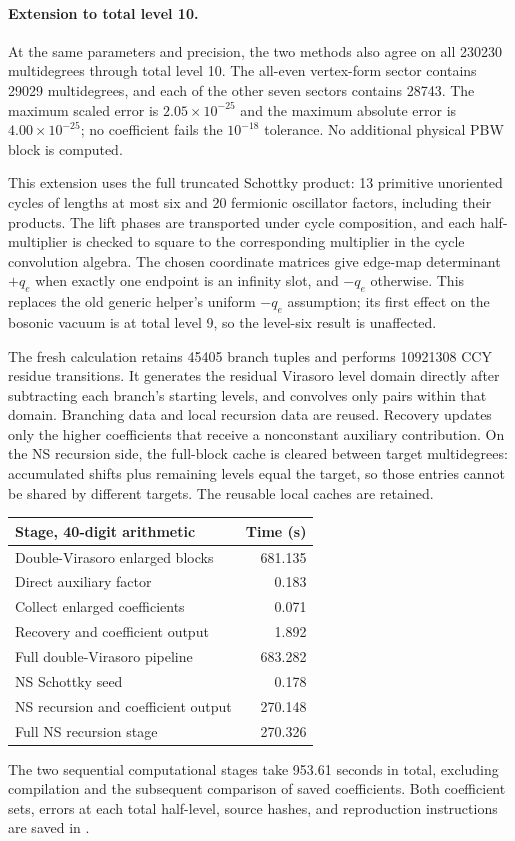 \documentclass[11pt]{article}
\numberwithin{equation}{section}
\begin{document}
\paragraph{Extension to total level 10.}
At the same parameters and precision, the two methods also agree on all
230230 multidegrees through total level 10. The all-even vertex-form sector
contains 29029 multidegrees, and each of the other seven sectors contains
28743. The maximum scaled error is $2.05\times10^{-25}$ and the maximum
absolute error is $4.00\times10^{-25}$; no coefficient fails the
$10^{-18}$ tolerance. No additional physical PBW block is computed.

This extension uses the full truncated Schottky product: 13 primitive
unoriented cycles of lengths at most six and 20 fermionic oscillator
factors, including their products. The lift phases are transported under
cycle composition, and each half-multiplier is checked to square to the
corresponding multiplier in the cycle convolution algebra. The chosen
coordinate matrices give edge-map determinant $+q_e$ when exactly one
endpoint is an infinity slot, and $-q_e$ otherwise. This replaces the old
generic helper's uniform $-q_e$ assumption; its first effect on the
bosonic vacuum is at total level 9, so the level-six result is unaffected.

The fresh calculation retains 45405 branch tuples and performs 10921308
CCY residue transitions. It generates the residual Virasoro level domain
directly after subtracting each branch's starting levels, and convolves
only pairs within that domain. Branching data and local recursion data
are reused. Recovery updates only the higher coefficients that receive
a nonconstant auxiliary contribution. On the NS recursion side, the
full-block cache is cleared between target multidegrees: accumulated
shifts plus remaining levels equal the target, so those entries cannot
be shared by different targets. The reusable local caches are retained.

\begin{center}
\small
\begin{tabular}{@{}lr@{}}
\toprule
Stage, 40-digit arithmetic & Time (s)\\
\midrule
Double-Virasoro enlarged blocks & 681.135\\
Direct auxiliary factor & 0.183\\
Collect enlarged coefficients & 0.071\\
Recovery and coefficient output & 1.892\\
\midrule
Full double-Virasoro pipeline & 683.282\\
NS Schottky seed & 0.178\\
NS recursion and coefficient output & 270.148\\
Full NS recursion stage & 270.326\\
\bottomrule
\end{tabular}
\end{center}
The two sequential computational stages take 953.61 seconds in total,
excluding compilation and the subsequent comparison of saved coefficients.
Both coefficient sets, errors at each total half-level, source hashes, and
reproduction instructions are saved in
.
\end{document}
